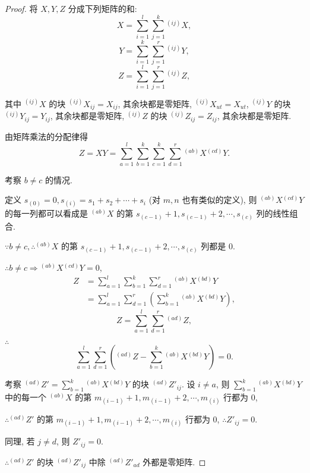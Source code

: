 \documentclass{ctexart}
\begin{document}
\begin{proof}
    将 $X,Y,Z$ 分成下列矩阵的和:
    \[X=\sum\limits_{i=1}^{l}\sum\limits_{j=1}^{k}{}^{(ij)}X,\]
    \[Y=\sum\limits_{i=1}^{k}\sum\limits_{j=1}^{r}{}^{(ij)}Y,\]
    \[Z=\sum\limits_{i=1}^{l}\sum\limits_{j=1}^{r}{}^{(ij)}Z,\]

    其中 ${}^{(ij)}X$ 的块 ${}^{(ij)}X_{ij}=X_{ij}$, 其余块都是零矩阵, ${}^{(ij)}X_{ut}=X_{ut}$, ${}^{(ij)}Y$ 的块 ${}^{(ij)}Y_{ij}=Y_{ij}$, 其余块都是零矩阵, ${}^{(ij)}Z$ 的块 ${}^{(ij)}Z_{ij}=Z_{ij}$, 其余块都是零矩阵.

    由矩阵乘法的分配律得
    \[Z=XY=\sum\limits_{a=1}^{l}\sum\limits_{b=1}^{k}\sum\limits_{c=1}^{k}\sum\limits_{d=1}^{r}{}^{(ab)}X{}^{(cd)}Y.\]

    考察 $b\neq c$ 的情况.

    定义 $s_{(0)}=0,s_{(i)}=s_1+s_2+\cdots+s_i$ (对 $m,n$ 也有类似的定义), 则 ${}^{(ab)}X{}^{(cd)}Y$ 的每一列都可以看成是 ${}^{(ab)}X$ 的第 $s_{(c-1)}+1,s_{(c-1)}+2,\cdots,s_{(c)}$ 列的线性组合.

    $\because b\neq c,\therefore{}^{(ab)}X$ 的第 $s_{(c-1)}+1,s_{(c-1)}+2,\cdots,s_{(c)}$ 列都是 $0$.

    $\therefore b\neq c\Rightarrow{}^{(ab)}X{}^{(cd)}Y=0$,
    \begin{align*}
        Z & =\sum\limits_{a=1}^{l}\sum\limits_{b=1}^{k}\sum\limits_{d=1}^{r}{}^{(ab)}X{}^{(bd)}Y \\
        & =\sum\limits_{a=1}^{l}\sum\limits_{d=1}^{r}\left(\sum\limits_{b=1}^{k}{}^{(ab)}X{}^{(bd)}Y\right),
    \end{align*}
    \[Z=\sum\limits_{a=1}^{l}\sum\limits_{d=1}^{r}{}^{(ad)}Z,\]

    $\therefore$
    \begin{equation}\label{eq2.7}
        \sum\limits_{a=1}^{l}\sum\limits_{d=1}^{r}\left({}^{(ad)}Z-\sum\limits_{b=1}^{k}{}^{(ab)}X{}^{(bd)}Y\right)=0.
    \end{equation}

    考察 $^{(ad)}Z'=\sum\limits_{b=1}^{k}{}^{(ab)}X{}^{(bd)}Y$ 的块 $^{(ad)}Z'_{ij}$. 设 $i\neq a$, 则 $\sum\limits_{b=1}^{k}{}^{(ab)}X{}^{(bd)}Y$ 中的每一个 $^{(ab)}X$ 的第 $m_{(i-1)}+1,m_{(i-1)}+2,\cdots,m_{(i)}$ 行都为 $0$,

    $\therefore{}^{(ad)}Z'$ 的第 $m_{(i-1)}+1,m_{(i-1)}+2,\cdots,m_{(i)}$ 行都为 $0$, $\therefore Z'_{ij}=0$.

    同理, 若 $j\neq d$, 则 $Z'_{ij}=0$.

    $\therefore{}^{(ad)}Z'$ 的块 $^{(ad)}Z'_{ij}$ 中除 $^{(ad)}Z'_{ad}$ 外都是零矩阵.


\end{proof}
\end{document}
